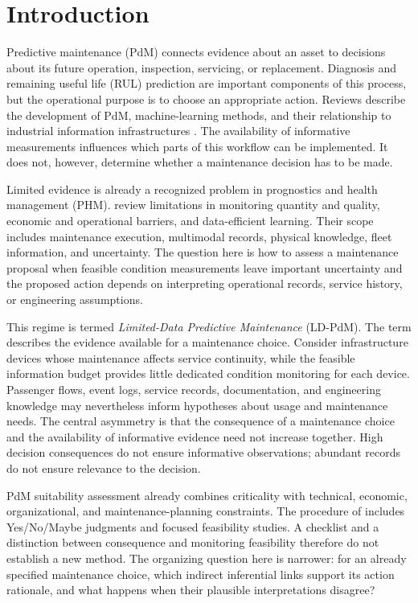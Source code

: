 \documentclass[symmetry,article,submit,pdftex,oneauthor]{Definitions/mdpi}
\begin{document}
\section{Introduction}
\label{sec:introduction}

Predictive maintenance (PdM) connects evidence about an asset to decisions about its future operation, inspection, servicing, or replacement. Diagnosis and remaining useful life (RUL) prediction are important components of this process, but the operational purpose is to choose an appropriate action. Reviews describe the development of PdM, machine-learning methods, and their relationship to industrial information infrastructures \citep{Selcuk20171670,Carvalho2019,Cinar2020}. The availability of informative measurements influences which parts of this workflow can be implemented. It does not, however, determine whether a maintenance decision has to be made.

Limited evidence is already a recognized problem in prognostics and health management (PHM). \citet{Li2024SmallDataPHM} review limitations in monitoring quantity and quality, economic and operational barriers, and data-efficient learning. Their scope includes maintenance execution, multimodal records, physical knowledge, fleet information, and uncertainty. The question here is how to assess a maintenance proposal when feasible condition measurements leave important uncertainty and the proposed action depends on interpreting operational records, service history, or engineering assumptions.

This regime is termed \emph{Limited-Data Predictive Maintenance} (LD-PdM). The term describes the evidence available for a maintenance choice. Consider infrastructure devices whose maintenance affects service continuity, while the feasible information budget provides little dedicated condition monitoring for each device. Passenger flows, event logs, service records, documentation, and engineering knowledge may nevertheless inform hypotheses about usage and maintenance needs. The central asymmetry is that the consequence of a maintenance choice and the availability of informative evidence need not increase together. High decision consequences do not ensure informative observations; abundant records do not ensure relevance to the decision.

PdM suitability assessment already combines criticality with technical, economic, organizational, and maintenance-planning constraints. The procedure of \citet{Tiddens2018PdMSelection} includes Yes/No/Maybe judgments and focused feasibility studies. A checklist and a distinction between consequence and monitoring feasibility therefore do not establish a new method. The organizing question here is narrower: for an already specified maintenance choice, which indirect inferential links support its action rationale, and what happens when their plausible interpretations disagree?
\end{document}
